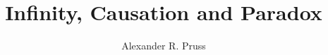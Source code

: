 \ifdefined\book
\else

\title{Infinity, Causation and Paradox}
\author{Alexander R. Pruss}


\setcounter{secnumdepth}{3}
\setcounter{tocdepth}{4}


\fi

